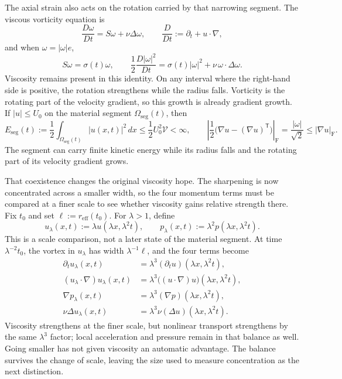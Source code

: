 The axial strain also acts on the rotation carried by that narrowing segment.
The viscous vorticity equation is
\[
  \frac{D\omega}{Dt}
  =
  S\omega+\nu\Delta\omega,
  \qquad
  \frac{D}{Dt}
  :=
  \partial_t+u\cdot\nabla,
\]
and when \(\omega=|\omega|e\),
\[
  S\omega
  =
  \sigma(t)\omega,
  \qquad
  \frac12\frac{D|\omega|^2}{Dt}
  =
  \sigma(t)|\omega|^2
  +
  \nu\,\omega\cdot\Delta\omega.
\]
Viscosity remains present in this identity.
On any interval where the right-hand side is positive, the rotation strengthens while the radius falls.
Vorticity is the rotating part of the velocity gradient, so this growth is already gradient growth.
If \(|u|\leq U_0\) on the material segment \(\Omega_{\mathrm{seg}}(t)\), then
\[
  E_{\mathrm{seg}}(t)
  :=
  \frac12\int_{\Omega_{\mathrm{seg}}(t)}|u(x,t)|^2\,dx
  \leq
  \frac12U_0^2\mathcal V
  <
  \infty,
  \qquad
  \left|\frac12\bigl(\nabla u-(\nabla u)^{\mathsf T}\bigr)\right|_{\mathrm F}
  =
  \frac{|\omega|}{\sqrt2}
  \leq
  |\nabla u|_{\mathrm F}.
\]
The segment can carry finite kinetic energy while its radius falls and the rotating part of its velocity gradient grows.


That coexistence changes the original viscosity hope.
The sharpening is now concentrated across a smaller width, so the four momentum terms must be compared at a finer scale to see whether viscosity gains relative strength there.
Fix \(t_0\) and set \(\ell:=r_{\mathrm{eff}}(t_0)\).
For \(\lambda>1\), define
\[
  u_\lambda(x,t)
  :=
  \lambda u(\lambda x,\lambda^2t),
  \qquad
  p_\lambda(x,t)
  :=
  \lambda^2p(\lambda x,\lambda^2t).
\]
This is a scale comparison, not a later state of the material segment.
At time \(\lambda^{-2}t_0\), the vortex in \(u_\lambda\) has width \(\lambda^{-1}\ell\), and the four terms become
\[
\begin{aligned}
  \partial_tu_\lambda(x,t)
  &=
  \lambda^3(\partial_tu)(\lambda x,\lambda^2t),
  \\
  (u_\lambda\cdot\nabla)u_\lambda(x,t)
  &=
  \lambda^3\bigl((u\cdot\nabla)u\bigr)(\lambda x,\lambda^2t),
  \\
  \nabla p_\lambda(x,t)
  &=
  \lambda^3(\nabla p)(\lambda x,\lambda^2t),
  \\
  \nu\Delta u_\lambda(x,t)
  &=
  \lambda^3\nu(\Delta u)(\lambda x,\lambda^2t).
\end{aligned}
\]
Viscosity strengthens at the finer scale, but nonlinear transport strengthens by the same \(\lambda^3\) factor; local acceleration and pressure remain in that balance as well.
Going smaller has not given viscosity an automatic advantage.
The balance survives the change of scale, leaving the size used to measure concentration as the next distinction.


